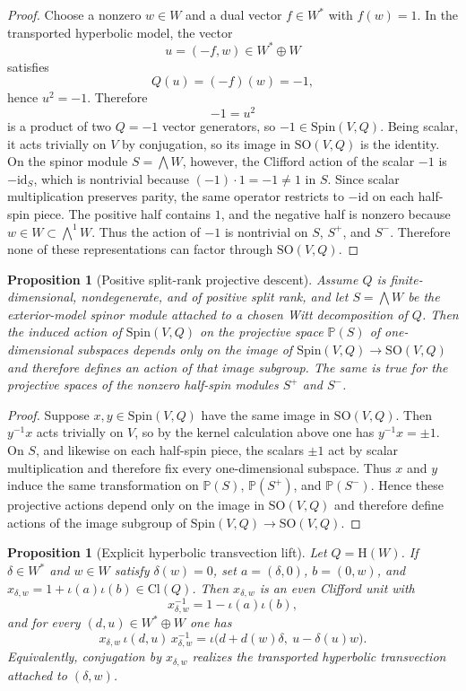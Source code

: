 \documentclass{birkjour}
\theoremstyle{plain}
\newtheorem{proposition}[theorem]{Proposition}
\theoremstyle{definition}
\theoremstyle{remark}
\numberwithin{equation}{section}
\newcommand{\Cl}{\mathrm{Cl}}
\newcommand{\Spin}{\mathrm{Spin}}
\newcommand{\SO}{\mathrm{SO}}
\newcommand{\Hyp}{\mathrm{H}}
\begin{document}
\begin{proof}
Choose a nonzero $w\in W$ and a dual vector $f\in W^*$ with $f(w)=1$. In the
transported hyperbolic model, the vector
\[
  u=(-f,w)\in W^*\oplus W
\]
satisfies
\[
  Q(u)=(-f)(w)=-1,
\]
hence $u^2=-1$. Therefore
\[
  -1=u^2
\]
is a product of two \(Q=-1\) vector generators, so $-1\in \Spin(V,Q)$. Being
scalar, it acts trivially on $V$ by conjugation, so its image in $\SO(V,Q)$ is
the identity.
On the spinor module $S=\bigwedge W$, however, the Clifford action of the
scalar $-1$ is $-\mathrm{id}_S$, which is nontrivial because
$(-1)\cdot 1=-1\neq 1$ in $S$. Since scalar multiplication preserves parity,
the same operator restricts to $-\mathrm{id}$ on each half-spin piece. The
positive half contains $1$, and the negative half is nonzero because
$w\in W\subset \bigwedge^1 W$. Thus the action of $-1$ is nontrivial on $S$,
$S^+$, and $S^-$. Therefore none of these representations can factor through
$\SO(V,Q)$.
\end{proof}

\begin{proposition}[Positive split-rank projective descent]
\label{prop:projective-descent}
Assume $Q$ is finite-dimensional, nondegenerate, and of positive split rank,
and let $S=\bigwedge W$ be the exterior-model spinor module attached to a
chosen Witt decomposition of $Q$. Then the induced action of $\Spin(V,Q)$ on
the projective space $\mathbb{P}(S)$ of one-dimensional subspaces depends only
on the image of $\Spin(V,Q)\to\SO(V,Q)$ and therefore defines an action of
that image subgroup. The same is true for the projective spaces of the nonzero
half-spin modules $S^+$ and $S^-$.
\end{proposition}

\begin{proof}
Suppose $x,y\in \Spin(V,Q)$ have the same image in $\SO(V,Q)$. Then
$y^{-1}x$ acts trivially on $V$, so by the kernel calculation above one has
$y^{-1}x=\pm1$. On $S$, and likewise on each half-spin piece, the scalars
$\pm1$ act by scalar multiplication and therefore fix every one-dimensional
subspace. Thus $x$ and $y$ induce the same transformation on
$\mathbb{P}(S)$, $\mathbb{P}(S^+)$, and $\mathbb{P}(S^-)$. Hence these
projective actions depend only on the image in $\SO(V,Q)$ and therefore define
actions of the image subgroup of $\Spin(V,Q)\to\SO(V,Q)$.
\end{proof}

\begin{proposition}[Explicit hyperbolic transvection lift]
\label{prop:transvection-unit}
Let $Q=\Hyp(W)$. If $\delta\in W^*$ and $w\in W$ satisfy $\delta(w)=0$,
set \(a=(\delta,0)\), \(b=(0,w)\), and
\(x_{\delta,w}=1+\iota(a)\iota(b)\in \Cl(Q)\).
Then $x_{\delta,w}$ is an even Clifford unit with
\[
  x_{\delta,w}^{-1}=1-\iota(a)\iota(b),
\]
and for every $(d,u)\in W^*\oplus W$ one has
\[
  x_{\delta,w}\,\iota(d,u)\,x_{\delta,w}^{-1}
  =
  \iota\bigl(d+d(w)\delta,\ u-\delta(u)w\bigr).
\]
Equivalently, conjugation by $x_{\delta,w}$ realizes the transported hyperbolic
transvection attached to $(\delta,w)$.
\end{proposition}
\end{document}
